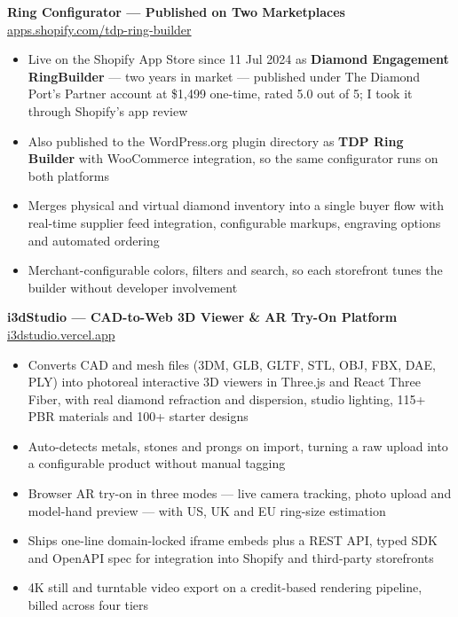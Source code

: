 \documentclass[10pt]{article}
\begin{document}
\textbf{Ring Configurator --- Published on Two Marketplaces} \hfill \href{https://apps.shopify.com/tdp-ring-builder}{apps.shopify.com/tdp-ring-builder}
\begin{itemize}
  \item Live on the Shopify App Store since 11 Jul 2024 as \textbf{Diamond Engagement RingBuilder} --- two years in market --- published under The Diamond Port's Partner account at \$1{,}499 one-time, rated 5.0 out of 5; I took it through Shopify's app review
  \item Also published to the WordPress.org plugin directory as \textbf{TDP Ring Builder} with WooCommerce integration, so the same configurator runs on both platforms
  \item Merges physical and virtual diamond inventory into a single buyer flow with real-time supplier feed integration, configurable markups, engraving options and automated ordering
  \item Merchant-configurable colors, filters and search, so each storefront tunes the builder without developer involvement
\end{itemize}

\vspace{1pt}

\textbf{i3dStudio --- CAD-to-Web 3D Viewer \& AR Try-On Platform} \hfill \href{https://i3dstudio.vercel.app}{i3dstudio.vercel.app}
\begin{itemize}
  \item Converts CAD and mesh files (3DM, GLB, GLTF, STL, OBJ, FBX, DAE, PLY) into photoreal interactive 3D viewers in Three.js and React Three Fiber, with real diamond refraction and dispersion, studio lighting, 115+ PBR materials and 100+ starter designs
  \item Auto-detects metals, stones and prongs on import, turning a raw upload into a configurable product without manual tagging
  \item Browser AR try-on in three modes --- live camera tracking, photo upload and model-hand preview --- with US, UK and EU ring-size estimation
  \item Ships one-line domain-locked iframe embeds plus a REST API, typed SDK and OpenAPI spec for integration into Shopify and third-party storefronts
  \item 4K still and turntable video export on a credit-based rendering pipeline, billed across four tiers
\end{itemize}

\vspace{1pt}
\end{document}
